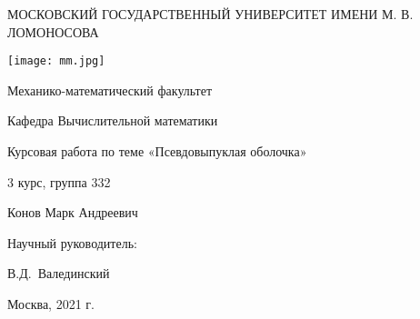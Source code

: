 \begin{titlepage}
  \begin{center}
    \large
 
 	МОСКОВСКИЙ ГОСУДАРСТВЕННЫЙ УНИВЕРСИТЕТ ИМЕНИ М. В. ЛОМОНОСОВА 
    \vspace{2cm}
    
    \texttt{[image: mm.jpg]} 
     
    Механико-математический факультет
    
    Кафедра Вычислительной математики
    \vspace{0.8cm} 
      
    Курсовая работа по теме «Псевдовыпуклая оболочка»
    \vspace{0.8cm} 
    
    3 курс, группа 332
    
    Конов Марк Андреевич\vspace{0.8cm} 
    
    Научный руководитель:
    
  	В.Д.~Валединский
\end{center}
 
\begin{center}
  Москва, 2021 г.
\end{center}
\end{titlepage}
\newpage

